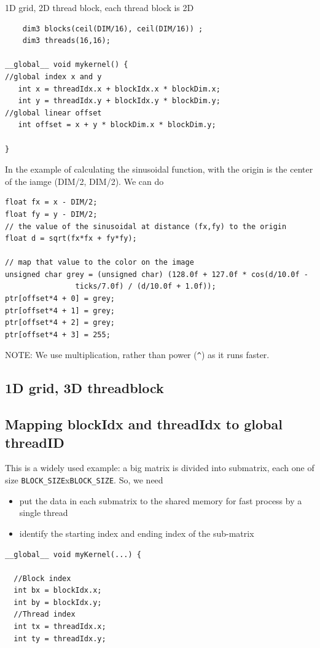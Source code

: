 1D grid, 2D thread block, each thread block is 2D
\begin{lstlisting}
    dim3 blocks(ceil(DIM/16), ceil(DIM/16)) ;
    dim3 threads(16,16);

__global__ void mykernel() {
//global index x and y
   int x = threadIdx.x + blockIdx.x * blockDim.x;
   int y = threadIdx.y + blockIdx.y * blockDim.y;
//global linear offset
   int offset = x + y * blockDim.x * blockDim.y;
   
}   
\end{lstlisting}
In the example of calculating the sinusoidal function, with the origin is the
center of the iamge (DIM/2, DIM/2). We can do
\begin{lstlisting}
float fx = x - DIM/2;
float fy = y - DIM/2;
// the value of the sinusoidal at distance (fx,fy) to the origin
float d = sqrt(fx*fx + fy*fy);

// map that value to the color on the image
unsigned char grey = (unsigned char) (128.0f + 127.0f * cos(d/10.0f -
                ticks/7.0f) / (d/10.0f + 1.0f));
ptr[offset*4 + 0] = grey;
ptr[offset*4 + 1] = grey;
ptr[offset*4 + 2] = grey;
ptr[offset*4 + 3] = 255;
\end{lstlisting}
NOTE: We use multiplication, rather than power (\verb!^!) as it runs faster.




\subsection{1D grid, 3D threadblock}

\subsection{Mapping blockIdx and threadIdx to global threadID}
\label{sec:mapp-block-thre-1}

This is a widely used example: a big matrix is divided into submatrix,
each one of size \verb!BLOCK_SIZE!x\verb!BLOCK_SIZE!. So, we need
\begin{itemize}
\item put the data in each submatrix to the shared memory for fast
  process by a single thread
\item identify the starting index and ending index of the sub-matrix
\end{itemize}

\begin{lstlisting}
__global__ void myKernel(...) {

  //Block index
  int bx = blockIdx.x;
  int by = blockIdx.y;
  //Thread index
  int tx = threadIdx.x;
  int ty = threadIdx.y;

\end{lstlisting}


